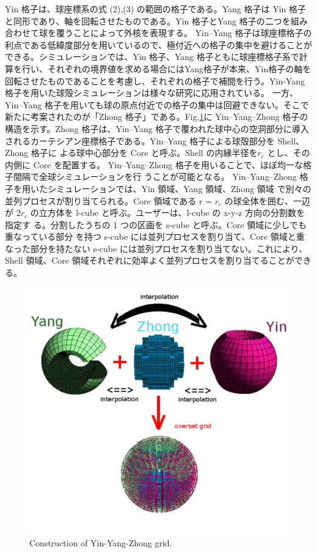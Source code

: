 \documentclass[12pt]{jsarticle}
\begin{document}
Yin 格子は、球座標系の式 (2),(3) の範囲の格子である。Yang 格子は Yin 格子と同形であり、軸を回転させたものである。Yin 格子とYang 格子の二つを組み合わせて球を覆うことによって外核を表現する。 Yin--Yang 格子は球座標格子の利点である低緯度部分を用いているので、極付近への格子の集中を避けることができる。シミュレーションでは、Yin 格子、Yang 格子ともに球座標格子系で計算を行い、それぞれの境界値を求める場合にはYang格子が本来、Yin格子の軸を回転させたものであることを考慮し、それぞれの格子で補間を行う。Yin-Yang 格子を用いた球殻シミュレーションは様々な研究に応用されている。
一方、Yin--Yang 格子を用いても球の原点付近での格子の集中は回避できない。そこで 新たに考案されたのが「Zhong 格子」である。Fig.\ref{fig:YYZthesis}に Yin--Yang--Zhong 格子の構造を示す。Zhong 格子は、Yin--Yang 格子で覆われた球中心の空洞部分に導入されるカーテシアン座標格子である。Yin--Yang 格子による球殻部分を Shell、Zhong 格子に よる球中心部分を Core と呼ぶ。Shell の内縁半径を$r_{c}$ とし、その内側に Core を配置する。 Yin--Yang--Zhong 格子を用いることで、ほぼ均一な格子間隔で全球シミュレーションを行 うことが可能となる。
Yin--Yang--Zhong 格子を用いたシミュレーションでは、Yin 領域、Yang 領域、Zhong 領域 で別々の並列プロセスが割り当てられる。Core 領域である r = $r_{c}$ の球全体を囲む、一辺 が 2$r_{c}$ の立方体を l-cube と呼ぶ。ユーザーは、l-cube の x-y-z 方向の分割数を指定す る。分割したうちの 1 つの区画を s-cube と呼ぶ。Core 領域に少しでも重なっている部分 を持つ s-cube には並列プロセスを割り当て、Core 領域と重なった部分を持たない s-cube には並列プロセスを割り当てない。これにより、Shell 領域、Core 領域それぞれに効率よく並列プロセスを割り当てることができる。

\begin{figure}[H]
\centering
\includegraphics[height=0.75\textheight,width=1.0\hsize,angle=0,keepaspectratio]{./Image/YYZthesis.pdf}
\caption{Construction of Yin-Yang-Zhong grid.} \label{fig:YYZthesis}
\end{figure}
\end{document}
